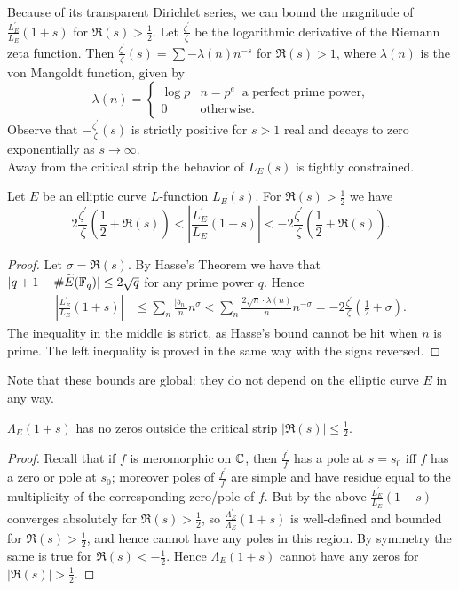 \documentclass[10pt]{article}
\newcommand{\pr}{^{\prime}}
\newcommand{\Les}{L_E(s)}
\newcommand{\ldLe}[1]{\frac{L_E\pr}{L_E}\left(#1\right)}
\newcommand{\ldLam}[1]{\frac{\Lambda_E\pr}{\Lambda_E}\left(#1\right)}
\begin{document}
Because of its transparent Dirichlet series, we can bound the magnitude of $\ldLe{1+s}$ for $\Re(s)>\frac{1}{2}$. Let $\frac{\zeta\pr}{\zeta}$ be the logarithmic derivative of the Riemann zeta function. Then $\frac{\zeta\pr}{\zeta}(s) = \sum -\lambda(n) n^{-s}$ for $\Re(s)>1$, where $\lambda(n)$ is the von Mangoldt function, given by
\begin{equation}\label{eqn:vonmangoldt}
\lambda(n) = \begin{cases} \log p & n = p^e \;\;\text{a perfect prime power,} \\ 0 & \text{otherwise.} \end{cases}
\end{equation}
Observe that $-\frac{\zeta\pr}{\zeta}(s)$ is strictly positive for $s > 1$ real and decays to zero exponentially as $s \to \infty$. \\

Away from the critical strip the behavior of $\Les$ is tightly constrained.
\begin{lemma}\label{lem:ldLe_bound}
Let $E$ be an elliptic curve $L$-function $L_E(s)$. For $\Re(s)>\frac{1}{2}$ we have\begin{equation}
2\frac{\zeta\pr}{\zeta}\left(\frac{1}{2}+\Re(s)\right) < \left| \ldLe{1+s}\right| < -2\frac{\zeta\pr}{\zeta}\left(\frac{1}{2}+\Re(s)\right).
\end{equation}
\end{lemma}

\begin{proof}
Let $\sigma = \Re(s)$. By Hasse's Theorem we have that $|q + 1 - \#\widetilde{E}(\mathbb{F}_{q})| \le 2\sqrt{q}$ for any prime power $q$. Hence
\begin{align*}
\left| \ldLe{1+s}\right| &\le \sum_n \frac{|b_n|}{n} n^\sigma < \sum_{n} \frac{2\sqrt{n} \cdot \lambda(n)}{n} n^{-\sigma}  = -2\frac{\zeta\pr}{\zeta}\left(\frac{1}{2}+\sigma\right).
\end{align*}
The inequality in the middle is strict, as Hasse's bound cannot be hit when $n$ is prime. The left inequality is proved in the same way with the signs reversed.
\end{proof}
Note that these bounds are global: they do not depend on the elliptic curve $E$ in any way.

\begin{corollary}
$\Lambda_E(1+s)$ has no zeros outside the critical strip $|\Re(s)| \le \frac{1}{2}$.
\end{corollary}
\begin{proof}
Recall that if $f$ is meromorphic on $\mathbb{C}$, then $\frac{f\pr}{f}$ has a pole at $s=s_0$ iff $f$ has a zero or pole at $s_0$; moreover poles of $\frac{f\pr}{f}$ are simple and have residue equal to the multiplicity of the corresponding zero/pole of $f$. But by the above $\ldLe{1+s}$ converges absolutely for $\Re(s)>\frac{1}{2}$, so $\ldLam{1+s}$ is well-defined and bounded for $\Re(s)>\frac{1}{2}$, and hence cannot have any poles in this region. By symmetry the same is true for $\Re(s)<-\frac{1}{2}$. Hence $\Lambda_E(1+s)$ cannot have any zeros for $|\Re(s)| > \frac{1}{2}$.
\end{proof}
\end{document}
